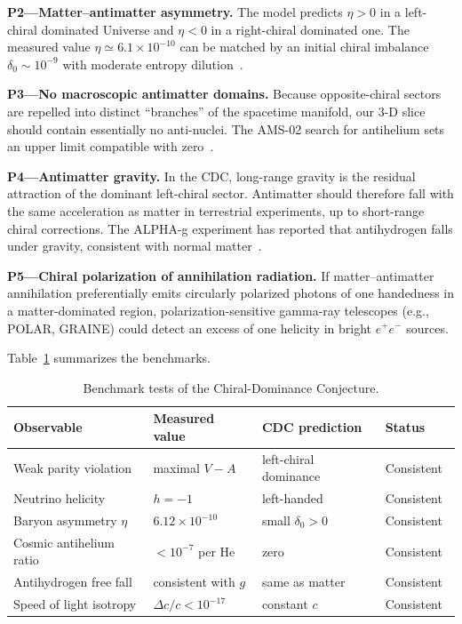 \documentclass[11pt,a4paper]{article}
\begin{document}
\textbf{P2---Matter--antimatter asymmetry.} The model predicts $\eta>0$ in a left-chiral dominated Universe and $\eta<0$ in a right-chiral dominated one. The measured value $\eta\simeq6.1\times10^{-10}$ can be matched by an initial chiral imbalance $\delta_0\sim10^{-9}$ with moderate entropy dilution~\cite{planck2020}.

\textbf{P3---No macroscopic antimatter domains.} Because opposite-chiral sectors are repelled into distinct ``branches'' of the spacetime manifold, our 3-D slice should contain essentially no anti-nuclei. The AMS-02 search for antihelium sets an upper limit compatible with zero~\cite{ams2021}.

\textbf{P4---Antimatter gravity.} In the CDC, long-range gravity is the residual attraction of the dominant left-chiral sector. Antimatter should therefore fall with the same acceleration as matter in terrestrial experiments, up to short-range chiral corrections. The ALPHA-g experiment has reported that antihydrogen falls under gravity, consistent with normal matter~\cite{alphag2023}.

\textbf{P5---Chiral polarization of annihilation radiation.} If matter--antimatter annihilation preferentially emits circularly polarized photons of one handedness in a matter-dominated region, polarization-sensitive gamma-ray telescopes (e.g., POLAR, GRAINE) could detect an excess of one helicity in bright $e^+e^-$ sources.

Table~\ref{tab:bench} summarizes the benchmarks.

\begin{table}[htbp]
\centering
\caption{Benchmark tests of the Chiral-Dominance Conjecture.}
\label{tab:bench}
\begin{tabular}{@{}llll@{}}
\toprule
Observable & Measured value & CDC prediction & Status \\
\midrule
Weak parity violation & maximal $V-A$ & left-chiral dominance & Consistent~\cite{wu1957,lep2006} \\
Neutrino helicity & $h=-1$ & left-handed & Consistent~\cite{goldhaber1958} \\
Baryon asymmetry $\eta$ & $6.12\times10^{-10}$ & small $\delta_0>0$ & Consistent~\cite{planck2020} \\
Cosmic antihelium ratio & $<10^{-7}$ per He & zero & Consistent~\cite{ams2021} \\
Antihydrogen free fall & consistent with $g$ & same as matter & Consistent~\cite{alphag2023} \\
Speed of light isotropy & $\Delta c/c<10^{-17}$ & constant $c$ & Consistent~\cite{planck2020} \\
\bottomrule
\end{tabular}
\end{table}
\end{document}
